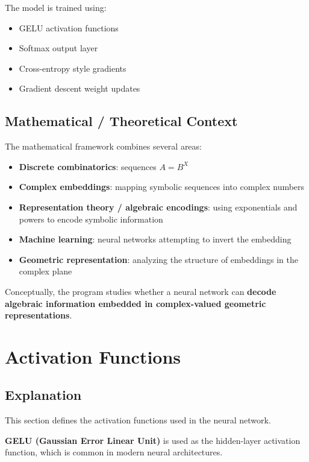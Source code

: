 The model is trained using:

\begin{itemize}
\item GELU activation functions
\item Softmax output layer
\item Cross-entropy style gradients
\item Gradient descent weight updates
\end{itemize}

\subsection{Mathematical / Theoretical Context}

The mathematical framework combines several areas:

\begin{itemize}
\item \textbf{Discrete combinatorics}: sequences \(A = B^X\)
\item \textbf{Complex embeddings}: mapping symbolic sequences into complex numbers
\item \textbf{Representation theory / algebraic encodings}: using exponentials and powers to encode symbolic information
\item \textbf{Machine learning}: neural networks attempting to invert the embedding
\item \textbf{Geometric representation}: analyzing the structure of embeddings in the complex plane
\end{itemize}

Conceptually, the program studies whether a neural network can \textbf{decode algebraic information embedded in complex-valued geometric representations}.

\newpage

\section{Activation Functions}

\subsection{Explanation}

This section defines the activation functions used in the neural network.

\textbf{GELU (Gaussian Error Linear Unit)} is used as the hidden-layer activation function, which is common in modern neural architectures.

